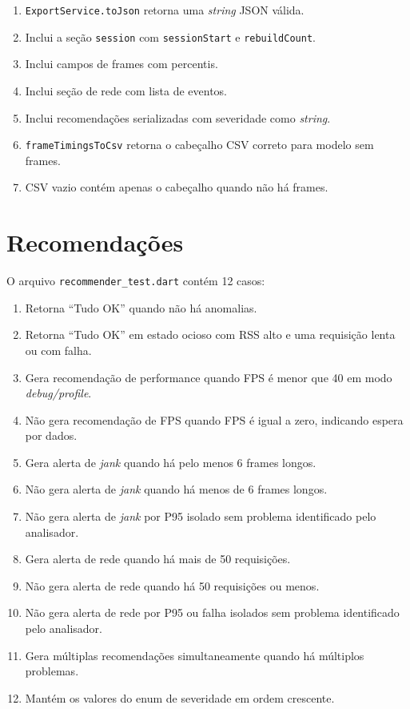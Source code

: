 \begin{enumerate}
  \item \texttt{ExportService.toJson} retorna uma \textit{string} JSON válida.
  \item Inclui a seção \texttt{session} com \texttt{sessionStart} e \texttt{rebuildCount}.
  \item Inclui campos de frames com percentis.
  \item Inclui seção de rede com lista de eventos.
  \item Inclui recomendações serializadas com severidade como \textit{string}.
  \item \texttt{frameTimingsToCsv} retorna o cabeçalho CSV correto para modelo sem frames.
  \item CSV vazio contém apenas o cabeçalho quando não há frames.
\end{enumerate}

\section{Recomendações}

O arquivo \texttt{recommender\_test.dart} contém 12 casos:

\begin{enumerate}
  \item Retorna ``Tudo OK'' quando não há anomalias.
  \item Retorna ``Tudo OK'' em estado ocioso com RSS alto e uma requisição lenta ou com falha.
  \item Gera recomendação de performance quando FPS é menor que 40 em modo \textit{debug/profile}.
  \item Não gera recomendação de FPS quando FPS é igual a zero, indicando espera por dados.
  \item Gera alerta de \textit{jank} quando há pelo menos 6 frames longos.
  \item Não gera alerta de \textit{jank} quando há menos de 6 frames longos.
  \item Não gera alerta de \textit{jank} por P95 isolado sem problema identificado pelo analisador.
  \item Gera alerta de rede quando há mais de 50 requisições.
  \item Não gera alerta de rede quando há 50 requisições ou menos.
  \item Não gera alerta de rede por P95 ou falha isolados sem problema identificado pelo analisador.
  \item Gera múltiplas recomendações simultaneamente quando há múltiplos problemas.
  \item Mantém os valores do enum de severidade em ordem crescente.
\end{enumerate}
